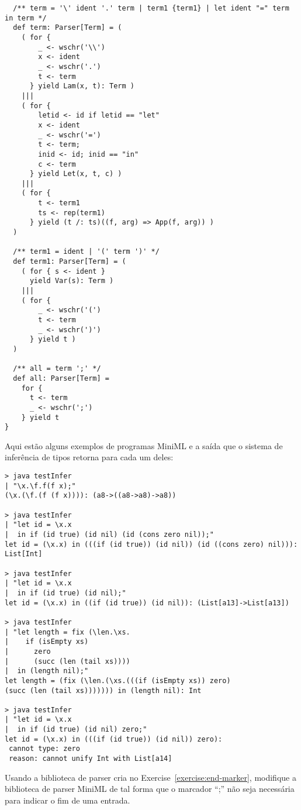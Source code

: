 {\begin{lstlisting}
  /** term = '\' ident '.' term | term1 {term1} | let ident "=" term in term */
  def term: Parser[Term] = (
    ( for {
        _ <- wschr('\\')
        x <- ident
        _ <- wschr('.')
        t <- term
      } yield Lam(x, t): Term )
    |||
    ( for {
        letid <- id if letid == "let"
        x <- ident
        _ <- wschr('=')
        t <- term; 
        inid <- id; inid == "in"
        c <- term
      } yield Let(x, t, c) )
    |||
    ( for {
        t <- term1
        ts <- rep(term1)
      } yield (t /: ts)((f, arg) => App(f, arg)) )
  )     

  /** term1 = ident | '(' term ')' */
  def term1: Parser[Term] = (
    ( for { s <- ident }
      yield Var(s): Term )
    |||
    ( for {
        _ <- wschr('(')
        t <- term
        _ <- wschr(')')
      } yield t )
  )

  /** all = term ';' */
  def all: Parser[Term] = 
    for {
      t <- term
      _ <- wschr(';')
    } yield t
}
\end{lstlisting}
Aqui estão alguns exemplos de programas MiniML e a saída que o sistema de inferência de tipos retorna para cada um deles:
\begin{lstlisting}
> java testInfer
| "\x.\f.f(f x);"
(\x.(\f.(f (f x)))): (a8->((a8->a8)->a8))

> java testInfer 
| "let id = \x.x  
|  in if (id true) (id nil) (id (cons zero nil));"
let id = (\x.x) in (((if (id true)) (id nil)) (id ((cons zero) nil))): List[Int]

> java testInfer
| "let id = \x.x 
|  in if (id true) (id nil);"
let id = (\x.x) in ((if (id true)) (id nil)): (List[a13]->List[a13])

> java testInfer
| "let length = fix (\len.\xs.
|    if (isEmpty xs) 
|      zero 
|      (succ (len (tail xs))))
|  in (length nil);"
let length = (fix (\len.(\xs.(((if (isEmpty xs)) zero) 
(succ (len (tail xs))))))) in (length nil): Int

> java testInfer 
| "let id = \x.x 
|  in if (id true) (id nil) zero;"
let id = (\x.x) in (((if (id true)) (id nil)) zero): 
 cannot type: zero
 reason: cannot unify Int with List[a14]
\end{lstlisting}

\begin{exercise}\label{exercise:hm-parse} Usando a biblioteca de parser cria no
Exercise~\ref{exercise:end-marker}, modifique a biblioteca de parser MiniML de tal forma
que o marcador ``;'' não seja necessária para indicar o fim de uma entrada.
\end{exercise}
}

